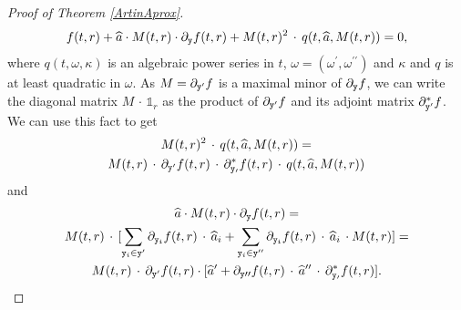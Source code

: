 \documentclass[10pt, a4paper]{article}
\def\wh{\widehat}
\theoremstyle{remark}
\theoremstyle{remark}
\begin{document}
\begin{proof}[Proof of Theorem \ref{ArtinAprox}]
\begin{equation}\label{2.1}
    f(t,r)+\wh{a}\cdot M(t,r)\cdot\partial_{\tt{y}}f(t,r)+M(t,r)^2\,\cdot\, q(t,\wh{a},M(t,r))=0,
\end{equation}
where $q(t,\omega,\kappa)$ is an algebraic power series in $t$, $\omega=(\omega^\prime,\omega^{\prime \prime})$ and $\kappa$ and $q$ is at least quadratic in $\omega$. As $M=\partial_{\tt{y}^\prime}f$ is a maximal minor of $\partial_{\tt{y}} f$, we can write the diagonal matrix $M\,\cdot\, \mathbb{1}_r$ as the product of $\partial_{\tt{y}^\prime}f$ and its adjoint matrix $\partial_{\tt{y}^\prime}^*f$. We can use this fact to get
\begin{equation}\label{2.2}
\begin{gathered}
M(t,r)^2\,\cdot\, q(t,\wh{a},M(t,r))=\\
M(t,r)\,\cdot\,\partial_{\tt{y}^\prime}f(t,r)\,\cdot\,\partial_{\tt{y}_\prime}^*f(t,r)\,\cdot\, q(t,\wh{a},M(t,r))
\end{gathered}
\end{equation}
and
\begin{equation}\label{2.3}
\begin{gathered}
\wh{a}\cdot M(t,r)\cdot\partial_{\tt{y}}f(t,r)=\\
M(t,r)\,\cdot\,[\sum_{\mathtt{y}_i\in\mathtt{y}^\prime}\partial_{\tt{y}_{i}}f(t,r)\,\cdot\, \wh{a}_{i}+\sum_{\mathtt{y}_i\in\mathtt{y}^{\prime\prime}}\partial_{\tt{y}_{i}}f(t,r)\,\cdot\,\wh{a}_{i}\,\cdot M(t,r)]=\\
M(t,r)\,\cdot\,\partial_{\tt{y}^\prime}f(t,r)\cdot[\wh{a}^\prime+\partial_{\tt{y}{\prime \prime}}f(t,r)\,\cdot\,\wh{a}^{\prime \prime}\,\cdot\,\partial_{\tt{y}_\prime}^*f(t,r)].
\end{gathered}
\end{equation}


\end{proof}
\end{document}
